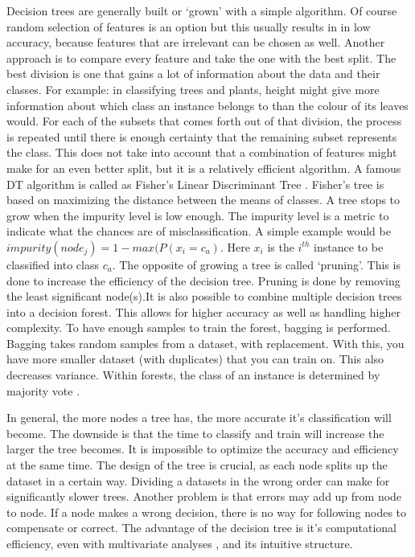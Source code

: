 Decision trees are generally built or `grown' with a simple algorithm. Of course random selection of features is an option but this usually results in in low accuracy, because features that are irrelevant can be chosen as well. Another approach is to compare every feature and take the one with the best split. The best division is one that gains a lot of information about the data and their classes. For example: in classifying trees and plants, height might give more information about which class an instance belongs to than the colour of its leaves would. For each of the subsets that comes forth out of that division, the process is repeated until there is enough certainty that the remaining subset represents the class. This does not take into account that a combination of features might make for an even better split, but it is a relatively efficient algorithm. A famous DT algorithm is called as Fisher's Linear Discriminant Tree \cite{LópezChau20136283}. Fisher's tree is based on maximizing the distance between the means of classes. A tree stops to grow when the impurity level is low enough. The impurity level is a metric to indicate what the chances are of misclassification. A simple example would be $impurity(node_j) = 1 - max(P(x_i = c_a) $. Here $x_i$ is the $i^{th}$ instance to be classified into class $c_a$. The opposite of growing a tree is called `pruning'. This is done to increase the efficiency of the decision tree. Pruning is done by removing the least significant node(s).It is also possible to combine multiple decision trees into a decision forest. This allows for higher accuracy as well as handling higher complexity. To have enough samples to train the forest, bagging is performed. Bagging takes random samples from a dataset, with replacement. With this, you have more smaller dataset (with duplicates) that you can train on. This also decreases variance. Within forests, the class of an instance is determined by majority vote \cite{Topouzelis201268}. 

In general, the more nodes a tree has, the more accurate it's classification will become. The downside is that the time to classify and train will increase the larger the tree becomes. It is impossible to optimize the accuracy and efficiency at the same time. The design of the tree is crucial, as each node splits up the dataset in a certain way. Dividing a datasets in the wrong order can make for significantly slower trees. Another problem is that errors may add up from node to node. If a node makes a wrong decision, there is no way for following nodes to compensate or correct. The advantage of the decision tree is it's computational efficiency, even with multivariate analyses \cite{safavian1991survey}, and its intuitive structure.